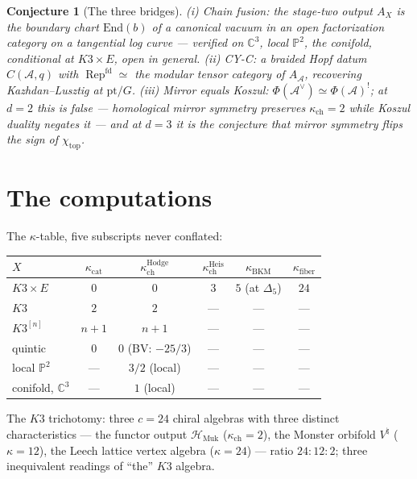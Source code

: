 \documentclass[11pt]{article}
\providecommand{\cA}{\mathcal{A}}
\providecommand{\cH}{\mathcal{H}}
\providecommand{\bC}{\mathbb{C}}
\providecommand{\bP}{\mathbb{P}}
\providecommand{\kch}{\kappa_{\mathrm{ch}}}
\providecommand{\kBKM}{\kappa_{\mathrm{BKM}}}
\providecommand{\kcat}{\kappa_{\mathrm{cat}}}
\providecommand{\kfib}{\kappa_{\mathrm{fiber}}}
\providecommand{\Dfive}{\Delta_5}
\providecommand{\Rep}{\operatorname{Rep}}
\providecommand{\Muk}{\mathrm{Muk}}
\newtheorem{conjecture}[theorem]{Conjecture}
\begin{document}
\begin{conjecture}[The three bridges]\label{conj:bridges}
\textup{(i) Chain fusion:} the stage-two output $A_X$ is the boundary
chart $\mathrm{End}(b)$ of a canonical vacuum in an open factorization
category on a tangential log curve --- verified on $\bC^3$, local
$\bP^2$, the conifold, conditional at $K3\times E$, open in general.
\textup{(ii) CY-C:} a braided Hopf datum $C(\cA,q)$ with
$\Rep^{\mathrm{fd}}\simeq$ the modular tensor category of $A_\cA$,
recovering Kazhdan--Lusztig at $\mathrm{pt}/G$.
\textup{(iii) Mirror equals Koszul:}
$\Phi(\cA^\vee)\simeq\Phi(\cA)^!$; at $d=2$ this is \emph{false} ---
homological mirror symmetry preserves $\kch=2$ while Koszul duality
negates it --- and at $d=3$ it is the conjecture that mirror symmetry
flips the sign of $\chi_{\mathrm{top}}$.
\end{conjecture}

\section{The computations}\label{sec:computations}

The $\kappa$-table, five subscripts never conflated:

\begin{center}
\renewcommand{\arraystretch}{1.25}
\begin{tabular}{lccccc}
$X$ & $\kcat$ & $\kch^{\mathrm{Hodge}}$ & $\kch^{\mathrm{Heis}}$ &
$\kBKM$ & $\kfib$\\
\hline
$K3\times E$ & $0$ & $0$ & $3$ & $5$ \textup{(at $\Dfive$)} & $24$\\
$K3$ & $2$ & $2$ & --- & --- & ---\\
$K3^{[n]}$ & $n{+}1$ & $n{+}1$ & --- & --- & ---\\
quintic & $0$ & $0$ \textup{(BV: $-25/3$)} & --- & --- & ---\\
local $\bP^2$ & --- & $3/2$ \textup{(local)} & --- & --- & ---\\
conifold, $\bC^3$ & --- & $1$ \textup{(local)} & --- & --- & ---\\
\end{tabular}
\end{center}

The $K3$ trichotomy: three $c=24$ chiral algebras with three distinct
characteristics --- the functor output $\cH_{\Muk}$ ($\kch=2$), the
Monster orbifold $V^\natural$ ($\kappa=12$), the Leech lattice vertex
algebra ($\kappa=24$) --- ratio $24:12:2$; three inequivalent readings
of ``the'' $K3$ algebra.
\end{document}
